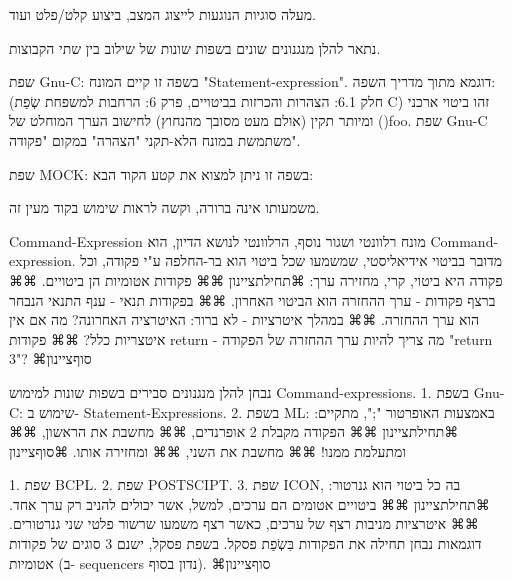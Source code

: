         מעלה סוגיות הנוגעות לייצוג המצב, ביצוע קלט/פלט ועוד.

        נתאר להלן מנגנונים שונים בשפות שונות של שילוב בין שתי הקבוצות.

        שפת Gnu-C:
        בשפה זו קיים המונח "Statement-expression".
        דוגמא מתוך מדריך השפה: (חלק 6.1: הצהרות והכרזות בביטויים, פרק 6: הרחבות למשפחת שְׂפַת C)
        זהו ביטוי ארכני ומיותר תקין (אולם מעט מסובך מהנחוץ) לחישוב הערך המוחלט של ()foo.
        שפת Gnu-C משתמשת במונח הלא-תקני "הצהרה" במקום "פקודה".

        שפת MOCK:
        בשפה זו ניתן למצוא את קטע הקוד הבא:

        משמעותו אינה ברורה, וקשה לראות שימוש בקוד מעין זה.

        Command-Expression
        מונח רלוונטי ושגור נוסף, הרלוונטי לנושא הדיון, הוא Command-expression. מדובר בביטוי אידיאליסטי, שמשמעו שכל ביטוי הוא בר-החלפה ע"י פקודה, וכל פקודה היא ביטוי, קרי, מחזירה ערך:
        ⌘תחילת{ציינון}
        ⌘⌘ פקודות אטומיות הן ביטויים.
        ⌘⌘ ברצף פקודות - ערך ההחזרה הוא הביטוי האחרון.
        ⌘⌘ בפקודות תנאי - ענף התנאי הנבחר הוא ערך ההחזרה.
        ⌘⌘ במהלך איטרציות - לא ברור: האיטרציה האחרונה? מה אם אין איטצריות כלל?
        ⌘⌘ פקודות return - מה צריך להיות ערך ההחזרה של הפקודה "return 3"?
      ⌘סוף{ציינון}

        נבחן להלן מנגנונים סבירים בשפות שונות למימוש Command-expressions.
        1. בשפת Gnu-C: שימוש ב- Statement-Expressions.
        2. בשפת ML: באמצעות האופרטור ";", מתקיים:
        ⌘תחילת{ציינון}
        ⌘⌘ הפקודה מקבלת 2 אופרנדים,
        ⌘⌘ מחשבת את הראשון,
        ⌘⌘ ומתעלמת ממנו!
        ⌘⌘ מחשבת את השני,
        ⌘⌘ ומחזירה אותו.
      ⌘סוף{ציינון}

        1. שפת BCPL.
        2. שפת POSTSCIPT.
        3. שפת ICON, בה כל ביטוי הוא גנרטור:
        ⌘תחילת{ציינון}
        ⌘⌘ ביטויים אטומים הם ערכים, למשל, אשר יכולים להניב רק ערך אחד.
        ⌘⌘ איטרציות מניבות רצף של ערכים, כאשר רצף משמעו שרשור פלטי שני גנרטורים.
        דוגמאות
        נבחן תחילה את הפקודות בִּשְׂפַת פסקל.
        בשפת פסקל, ישנם 3 סוגים של פקודות אטומיות (ב- sequencers נדון בסוף).
    ⌘סוף{ציינון}

